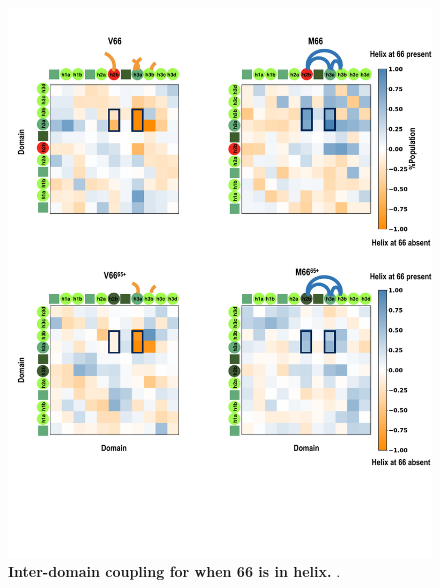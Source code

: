 \documentclass[journal=jacsat,manuscript=article]{achemso}
\begin{document}
\begin{figure}[!ht]
 \includegraphics[scale=0.5,width=\textwidth,trim={0 0cm 0 0},clip]{../figures/S9.pdf}
\caption{{\bf Inter-domain coupling for when 66 is in helix.}
.
 }
\label{S9} 
\end{figure}
\end{document}

